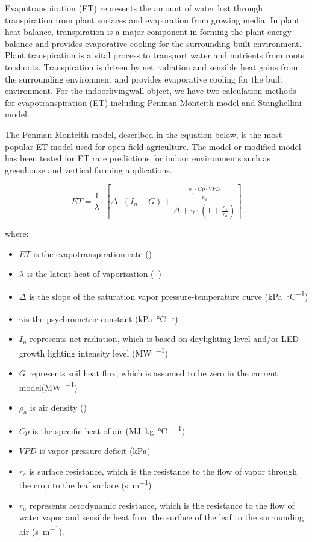 Evapotranspiration (ET) represents the amount of water lost through transpiration from plant surfaces and evaporation from growing media. In plant heat balance, transpiration is a major component in forming the plant energy balance and provides evaporative cooling for the surrounding built environment. Plant transpiration is a vital process to transport water and nutrients from roots to shoots. Transpiration is driven by net radiation and sensible heat gains from the surrounding environment and provides evaporative cooling for the built environment. For the indoorlivingwall object, we have two calculation methods for evapotranspiration (ET) including Penman-Monteith model and Stanghellini model.

The Penman-Monteith model, described in the equation below,  is the most popular ET model used for open field agriculture. The model or modified model has been tested for ET rate predictions for indoor environments such as greenhouse and vertical farming applications.

\begin{equation}
ET=\frac{1}{\lambda} \cdot \left[
  \Delta \cdot(I_n-G)
+ \frac{
    \frac{\rho_a \cdot Cp \cdot VPD}{r_a}
  }
  {
     \Delta+\gamma \cdot (1+\frac{r_s}{r_a} )
  }
\right]
\end{equation}

where:

\begin{itemize}
\tightlist
\item
  \(ET\) is the evapotranspiration rate (\si{\evapotranspirationRate})
\item
  \(\lambda\) is the latent heat of vaporization (\si{\mega\specificEnthalpy})
\item
  \(\Delta\) is the slope of the saturation vapor pressure-temperature curve (\si{\kPa\per\celsius})
\item
  \(\gamma\)is the psychrometric constant (\si{\kPa\per\celsius})
\item
  \(I_n\) represents net radiation, which is based on daylighting level and/or LED growth lighting intensity level (\si{\mega\watt\per\area})
\item
  \(G\) represents soil heat flux, which is assumed to be zero in the current model(\si{\MW\per\area})
\item
  \(\rho_a\) is air density (\si{\density})
\item
  \(Cp\) is the specific heat of air (\si{\mega\J\per\kg\per\celsius})
\item
  \(VPD\) is vapor pressure deficit (\si{\kPa})
\item
  \(r_s\) is surface resistance, which is the resistance to the flow of vapor through the crop to the leaf surface (\si{\s\per\m})
\item
  \(r_a\) represents aerodynamic resistance, which is the resistance to the flow of water vapor and sensible heat from the surface of the leaf to the surrounding air (\si{\s\per\m}).
\end{itemize}

